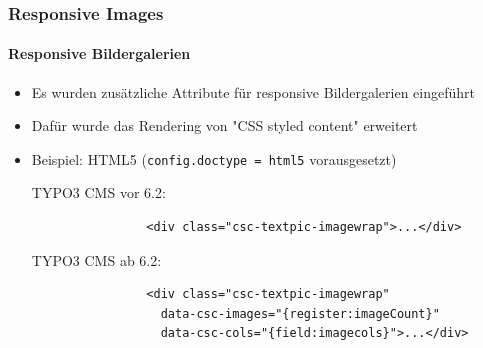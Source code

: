 \begin{frame}[fragile]
	\frametitle{Responsive Images}
	\framesubtitle{Responsive Bildergalerien}

	\begin{itemize}
		\item Es wurden zusätzliche Attribute für responsive Bildergalerien eingeführt
		\item Dafür wurde das Rendering von "CSS styled content" erweitert
		\item Beispiel: HTML5 (\texttt{config.doctype = html5} vorausgesetzt)\newline

			TYPO3 CMS vor 6.2:


			\begin{lstlisting}
				<div class="csc-textpic-imagewrap">...</div>
			\end{lstlisting}

			TYPO3 CMS ab 6.2:

			\begin{lstlisting}
				<div class="csc-textpic-imagewrap"
				  data-csc-images="{register:imageCount}"
				  data-csc-cols="{field:imagecols}">...</div>
			\end{lstlisting}

	\end{itemize}

\end{frame}


